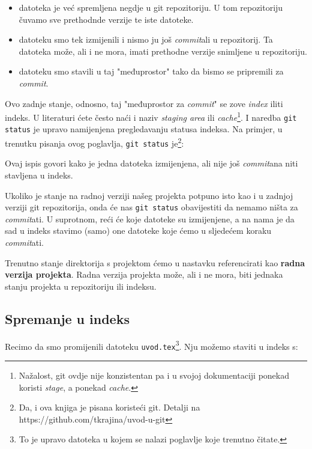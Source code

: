 \begin{itemize}
	\item datoteka je već spremljena negdje u git repozitoriju. U tom repozitoriju čuvamo sve prethodnde verzije te iste datoteke.
	\item datoteku smo tek izmijenili i nismo ju još \emph{commit}ali u repozitorij. Ta datoteka može, ali i ne mora, imati prethodne verzije snimljene u repozitoriju.
	\item datoteku smo stavili u taj "međuprostor" tako da bismo se pripremili za \emph{commit}.
\end{itemize}

Ovo zadnje stanje, odnosno, taj "međuprostor za \emph{commit}" se zove \emph{index} iliti indeks.
U literaturi ćete često naći i naziv \emph{staging area} ili \emph{cache}\footnote{Nažalost, git ovdje nije konzistentan pa i u svojoj dokumentaciji ponekad koristi \emph{stage}, a ponekad \emph{cache}.}.
I naredba \verb+git status+ je upravo namijenjena pregledavanju statusa indeksa.
Na primjer, u trenutku pisanja ovog poglavlja, \verb+git status+ je\footnote{Da, i ova knjiga je pisana koristeći git. Detalji na https://github.com/tkrajina/uvod-u-git}:



Ovaj ispis govori kako je jedna datoteka izmijenjena, ali nije još \emph{commit}ana niti stavljena u indeks.

Ukoliko je stanje na radnoj verziji našeg projekta potpuno isto kao i u zadnjoj verziji git repozitorija, onda će nas \verb+git status+ obavijestiti da nemamo ništa za \emph{commit}ati.
U suprotnom, reći će koje datoteke su izmijenjene, a na nama je da sad u indeks stavimo (samo) one datoteke koje ćemo u sljedećem koraku \emph{commit}ati.

Trenutno stanje direktorija s projektom ćemo u nastavku referencirati kao \textbf{radna verzija projekta}.
Radna verzija projekta može, ali i ne mora, biti jednaka stanju projekta u repozitoriju ili indeksu.

\subsection*{Spremanje u indeks}

Recimo da smo promijenili datoteku \verb+uvod.tex+\footnote{To je upravo datoteka u kojem se nalazi poglavlje koje trenutno čitate.}.
Nju možemo staviti u indeks s:

